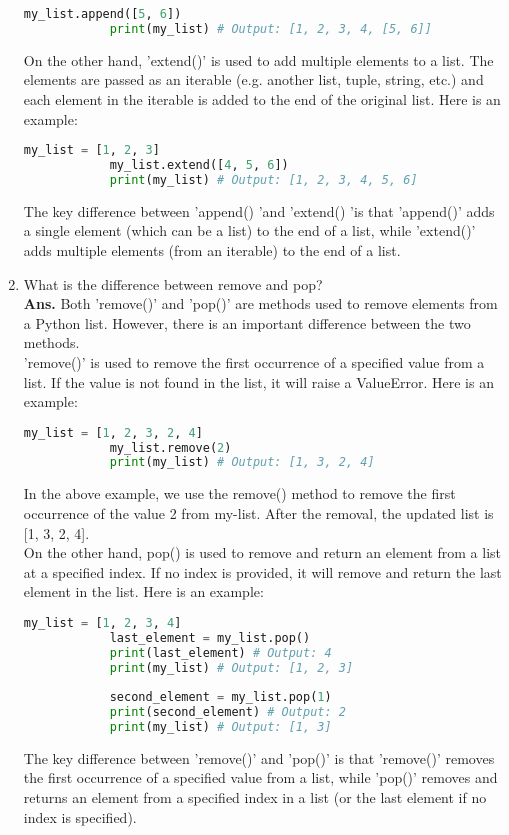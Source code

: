 \documentclass{article}
\begin{document}
\begin{enumerate}
\begin{lstlisting}[language=python, caption={append example}]
			my_list.append([5, 6])
			print(my_list) # Output: [1, 2, 3, 4, [5, 6]]
		\end{lstlisting}
		On the other hand, 'extend()' is used to add multiple elements to a list. The elements are passed as an iterable (e.g. another list, tuple, string, etc.) and each element in the iterable is added to the end of the original list. Here is an example:
		\begin{lstlisting}[language=python, caption={extend example}]
			my_list = [1, 2, 3]
			my_list.extend([4, 5, 6])
			print(my_list) # Output: [1, 2, 3, 4, 5, 6]
		\end{lstlisting}
		The key difference between 'append() 'and 'extend() 'is that 'append()' adds a single element (which can be a list) to the end of a list, while 'extend()' adds multiple elements (from an iterable) to the end of a list.
		
		\item What is the difference between remove and pop?\\
		
		\textbf{Ans.}  Both 'remove()' and 'pop()' are methods used to remove elements from a Python list. However, there is an important difference between the two methods.\\
		
		'remove()' is used to remove the first occurrence of a specified value from a list. If the value is not found in the list, it will raise a ValueError. Here is an example:
		\begin{lstlisting}[language=python, caption={remove example}]
			my_list = [1, 2, 3, 2, 4]
			my_list.remove(2)
			print(my_list) # Output: [1, 3, 2, 4]
		\end{lstlisting}
		In the above example, we use the remove() method to remove the first occurrence of the value 2 from my-list. After the removal, the updated list is [1, 3, 2, 4].\\
		
		On the other hand, pop() is used to remove and return an element from a list at a specified index. If no index is provided, it will remove and return the last element in the list. Here is an example:
		\begin{lstlisting}[language=python, caption={pop example}]
			my_list = [1, 2, 3, 4]
			last_element = my_list.pop()
			print(last_element) # Output: 4
			print(my_list) # Output: [1, 2, 3]
			
			second_element = my_list.pop(1)
			print(second_element) # Output: 2
			print(my_list) # Output: [1, 3]
		\end{lstlisting}
		The key difference between 'remove()' and 'pop()' is that 'remove()' removes the first occurrence of a specified value from a list, while 'pop()' removes and returns an element from a specified index in a list (or the last element if no index is specified).
	\end{enumerate}
\end{document}
